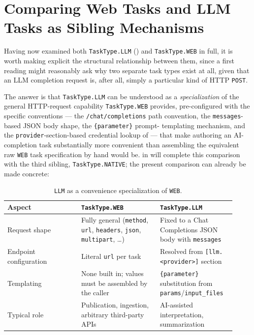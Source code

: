 \section{Comparing Web Tasks and LLM Tasks as Sibling Mechanisms}

Having now examined both \texttt{TaskType.LLM} () and
\texttt{TaskType.WEB} in full, it is worth making explicit the structural
relationship between them, since a first reading might reasonably ask why
two separate task types exist at all, given that an LLM completion request
is, after all, simply a particular kind of HTTP \texttt{POST}.

The answer is that \texttt{TaskType.LLM} can be understood as a
\emph{specialization} of the general HTTP-request capability
\texttt{TaskType.WEB} provides, pre-configured with the specific
conventions --- the \texttt{/chat/completions} path convention, the
\texttt{messages}-based JSON body shape, the \texttt{\{parameter\}} prompt-
templating mechanism, and the \texttt{provider}-section-based credential
lookup of  --- that make authoring an AI-completion
task substantially more convenient than assembling the equivalent raw
\texttt{WEB} task specification by hand would be.  in
 will complete this comparison with the third sibling,
\texttt{TaskType.NATIVE}; the present comparison can already be made
concrete:

\begin{table}[h]
\centering
\caption{\texttt{LLM} as a convenience specialization of \texttt{WEB}.}
\begin{tabular}{@{}p{0.3\linewidth}p{0.32\linewidth}p{0.3\linewidth}@{}}
\toprule
\textbf{Aspect} & \textbf{\texttt{TaskType.WEB}} & \textbf{\texttt{TaskType.LLM}} \\
\midrule
Request shape & Fully general (\texttt{method}, \texttt{url}, \texttt{headers}, \texttt{json}, \texttt{multipart}, \dots) & Fixed to a Chat Completions JSON body with \texttt{messages} \\
Endpoint configuration & Literal \texttt{url} per task & Resolved from \texttt{[llm.<provider>]} section \\
Templating & None built in; values must be assembled by the caller & \texttt{\{parameter\}} substitution from \texttt{params}/\texttt{input\_files} \\
Typical role & Publication, ingestion, arbitrary third-party APIs & AI-assisted interpretation, summarization \\
\bottomrule
\end{tabular}
\end{table}

